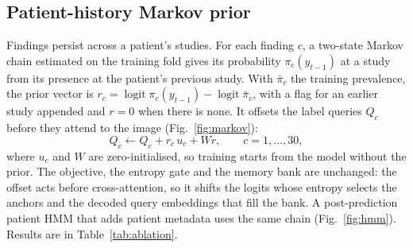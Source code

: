 \documentclass{article}
\begin{document}
\subsection{Patient-history Markov prior}
\label{sec:markov}
Findings persist across a patient's studies. For each finding $c$, a two-state Markov chain estimated on the training fold gives its probability $\pi_c(y_{t-1})$ at a study from its presence at the patient's previous study. With $\bar\pi_c$ the training prevalence, the prior vector is $r_c=\operatorname{logit}\pi_c(y_{t-1})-\operatorname{logit}\bar\pi_c$, with a flag for an earlier study appended and $r=0$ when there is none. It offsets the label queries $Q_c$ before they attend to the image (Fig.~\ref{fig:markov}):
\begin{equation}
Q_c\leftarrow Q_c+r_c\,u_c+W r,\qquad c=1,\dots,30,
\label{eq:qprior}
\end{equation}
where $u_c$ and $W$ are zero-initialised, so training starts from the model without the prior. The objective, the entropy gate and the memory bank are unchanged: the offset acts before cross-attention, so it shifts the logits whose entropy selects the anchors and the decoded query embeddings that fill the bank. A post-prediction patient HMM that adds patient metadata uses the same chain (Fig.~\ref{fig:hmm}). Results are in Table~\ref{tab:ablation}.
\end{document}
